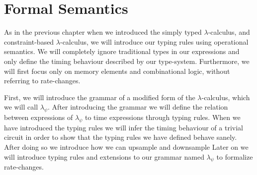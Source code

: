 %
%
%
%
%
%
\section{Formal Semantics}
As in the previous chapter when we introduced the simply typed $\lambda$-calculus, and constraint-based $\lambda$-calculus, we will introduce our typing rules using operational semantics.
We will completely ignore traditional types in our expressions and only define the timing behaviour described by our type-system.
Furthermore, we will first focus only on memory elements and combinational logic, without referring to rate-changes.

First, we will introduce the grammar of a modified form of the $\lambda$-calculus, which we will call $\lambda_\psi$.
After introducing the grammar we will define the relation between expressions of $\lambda_\psi$ to time expressions through typing rules.
When we have introduced the typing rules we will infer the timing behaviour of a trivial circuit in order to show that the typing rules we have defined behave sanely.
After doing so we introduce how we can upsample and downsample 
Later on we will introduce typing rules and extensions to our grammar named $\lambda_\psi$ to formalize rate-changes.


